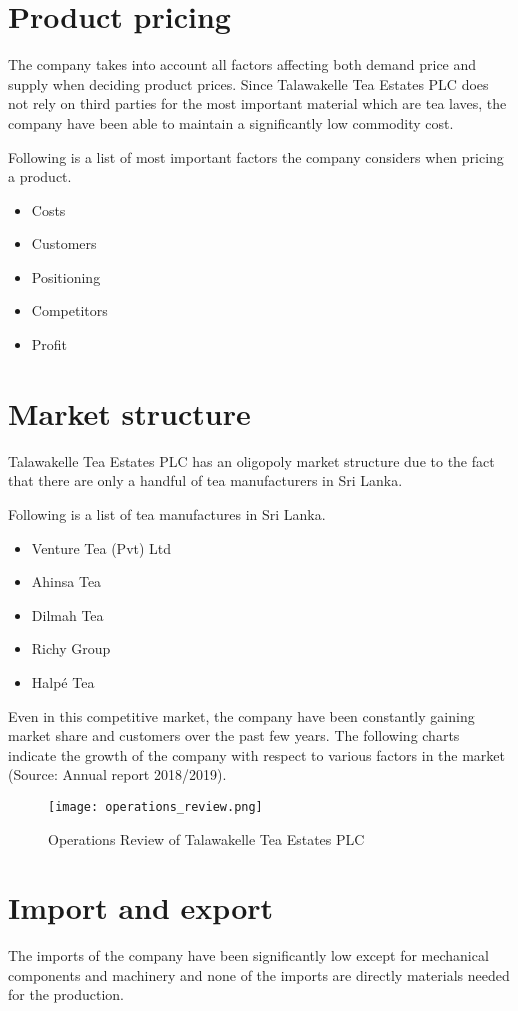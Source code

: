 \documentclass[12pt]{report}
\begin{document}
\chapter{Product pricing}
The company takes into account all factors affecting both demand price and supply when deciding product prices. Since Talawakelle Tea Estates PLC does not rely on third parties for the most important material which are tea laves, the company have been able to maintain a significantly low commodity cost.

Following is a list of most important factors the company considers when pricing a product.

\begin{itemize}
	\item {Costs}
	\item {Customers}
	\item {Positioning}
	\item {Competitors}
	\item {Profit}
\end{itemize}


\chapter{Market structure}
Talawakelle Tea Estates PLC has an oligopoly market structure due to the fact that there are only a handful of tea manufacturers in Sri Lanka.

Following is a list of tea manufactures in Sri Lanka.
\begin{itemize}
	\item {Venture Tea (Pvt) Ltd}
	\item {Ahinsa Tea}
	\item {Dilmah Tea}
	\item {Richy Group}
	\item {Halpé Tea}
\end{itemize}

Even in this competitive market, the company have been constantly gaining market share and customers over the past few years. The following charts indicate the growth of the company with respect to various factors in the market (Source: Annual report 2018/2019).

\begin{figure}[H]
	\centering
	\texttt{[image: operations\_review.png]}
	\caption{Operations Review of Talawakelle Tea Estates PLC}
\end{figure}

\chapter{Import and export}
The imports of the company have been significantly low except for mechanical components and machinery and none of the imports are directly materials needed for the production.
\end{document}
